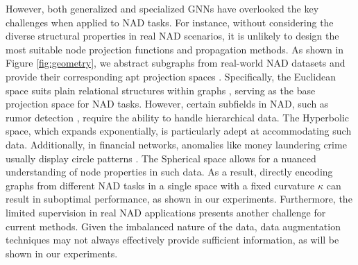 

However, both generalized and specialized GNNs have overlooked the key challenges when applied to NAD tasks. For instance, without considering the diverse structural properties in real NAD scenarios, it is unlikely to design the most suitable node projection functions and propagation methods. As shown in Figure \ref{fig:geometry}, we abstract subgraphs from real-world NAD datasets and provide their corresponding apt‌ projection spaces \citep{kappa20bachmann}. Specifically, the Euclidean space suits plain relational structures within graphs \citep{plain20bandyopadhyay}, serving as the base projection space for NAD tasks. However, certain subfields in NAD, such as rumor detection \citep{tree18ma, rumor20bian}, require the ability to handle hierarchical data. 
The Hyperbolic space, which expands exponentially, is particularly adept at accommodating such data. 
Additionally, in financial networks, anomalies like money laundering crime usually display circle patterns \citep{mlaund22dumitrescu, circle23altman}. 
The Spherical space allows for a nuanced understanding of node properties in such data. 
As a result, directly encoding graphs from different NAD tasks in a single space with a fixed curvature $\kappa$ can result in suboptimal performance, as shown in our experiments. Furthermore, the limited supervision in real NAD applications presents another challenge for current methods. Given the imbalanced nature of the data, data augmentation techniques may not always effectively provide sufficient information, as will be shown in our experiments. 

